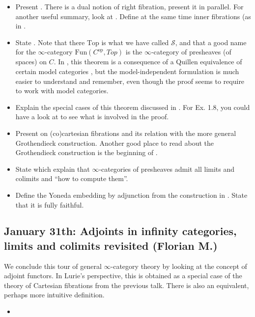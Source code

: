 \documentclass{amsart}
\theoremstyle{definition}
\theoremstyle{remark}
\newcommand{\op}{\mathrm{op}}
\begin{document}
\begin{itemize}
\item Present \cite[\S 2.1.1]{HTT}. There is a dual notion of right fibration, present it in parallel. For another useful summary, look at \cite[\S 1]{Barwick-Shah}. Define at the same time inner fibrations (as in \cite[Definition 2.0.0.3]{HTT}.
\item State \cite[Thm 1.4]{Barwick-Shah}. Note that there $\mathrm{Top}$ is what we have called $\mathcal{S}$, and that a good name for the $\infty$-category $\mathrm{Fun}(C^{\op},Top)$ is the $\infty$-category of presheaves (of spaces) on $C$. In \cite{HTT}, this theorem is a consequence of a Quillen equivalence of certain model categories \cite[Thm 2.2.1.2]{HTT}, but the model-independent formulation is much easier to understand and remember, even though the proof seems to require to work with model categories.
\item Explain the special cases of this theorem discussed in \cite[Ex. 1.5-1.9]{Barwick-Shah}. For Ex. 1.8, you could have a look at \cite[\S 1]{Barwick-Glasman} to see what is involved in the proof.
\item Present \cite[\S 3]{Barwick-Shah} on (co)cartesian fibrations and its relation with the more general Grothendieck construction. Another good place to read about the Grothendieck construction is the beginning of \cite[\S 1]{Mazel-Grothendieck}.
\item State \cite[Cor. 5.1.2.3-4]{HTT} which explain that $\infty$-categories of presheaves admit all limits and colimits and \enquote{how to compute them}. 
\item Define the Yoneda embedding by adjunction from the construction in \cite[Ex. 1.8]{Barwick-Shah}. State that it is fully faithful. 
\end{itemize}

\subsection{January 31th: Adjoints in infinity categories, limits and colimits revisited (Florian M.)
}

We conclude this tour of general $\infty$-category theory by looking at the concept of adjoint functors. In Lurie's perspective, this is obtained as a special case of the theory of Cartesian fibrations from the previous talk. There is also an equivalent, perhaps more intuitive definition. 

\begin{itemize}
\item 
\end{itemize}
\end{document}
